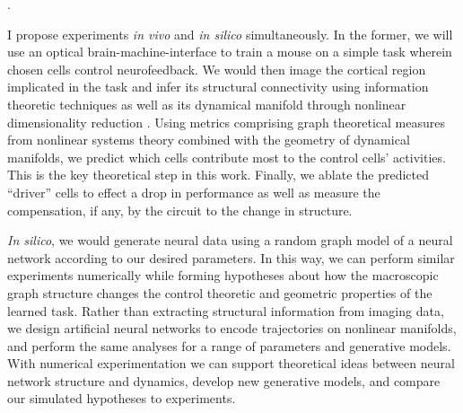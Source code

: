 \documentclass[a4paper,12pt]{article}
\begin{document}
\cite{Brockett2014} \cite{Tang2017, Zanudo2016}. 

I propose experiments \textit{in vivo} and \textit{in silico} simultaneously. In the former, we will use an optical brain-machine-interface to train a mouse on a simple task wherein chosen cells control neurofeedback. We would then image the cortical region implicated in the task and infer its structural connectivity using information theoretic techniques as well as its dynamical manifold through nonlinear dimensionality reduction \cite{Orlandi2014, Gashler2008}. Using metrics comprising graph theoretical measures from nonlinear systems theory combined with the geometry of dynamical manifolds, we predict which cells contribute most to the control cells' activities. This is the key theoretical step in this work. Finally, we ablate the predicted ``driver'' cells to effect a drop in performance as well as measure the compensation, if any, by the circuit to the change in structure. 

\textit{In silico}, we would generate neural data using a random graph model of a neural network according to our desired parameters. In this way, we can perform similar experiments numerically while forming hypotheses about how the macroscopic graph structure changes the control theoretic and geometric properties of the learned task. Rather than extracting structural information from imaging data, we design artificial neural networks to encode trajectories on nonlinear manifolds, and perform the same analyses for a range of parameters and generative models. With numerical experimentation we can support theoretical ideas between neural network structure and dynamics, develop new generative models, and compare our simulated hypotheses to experiments.   

\newpage


\end{document}
